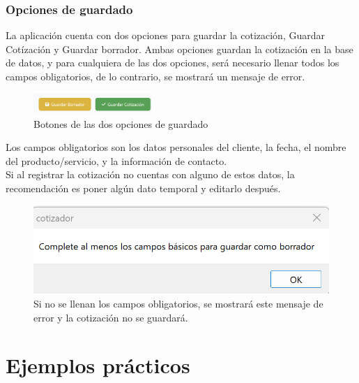 \documentclass{Pretexto/bluereport}
\begin{document}
\subsubsection{Opciones de guardado}
La aplicación cuenta con dos opciones para guardar la cotización, Guardar Cotízación y Guardar borrador.
Ambas opciones guardan la cotización en la base de datos, y para cualquiera de las dos opciones, será necesario
llenar todos los campos obligatorios, de lo contrario, se mostrará un mensaje de error. 
\begin{figure}[H]
    \centering
    \includegraphics[width=0.4\textwidth]{img/opciones_guardado.png}
    \caption{Botones de las dos opciones de guardado}
    \label{fig:opciones_guardado}
\end{figure}
Los campos obligatorios son 
los datos personales del cliente, la fecha, el nombre del producto/servicio, y la información de contacto.\\
 Si al registrar la cotización no cuentas con alguno de estos datos, la recomendación
 es poner algún dato temporal y editarlo después.
\begin{figure}[H] 
    \centering
        \includegraphics[width=0.35\linewidth]{img/mensaje_error.png}
    \caption{Si no se llenan los campos obligatorios, se mostrará este mensaje de error y la cotización no se guardará.}
    \label{fig:mensaje_error}
\end{figure}

\section{Ejemplos prácticos}
\end{document}
